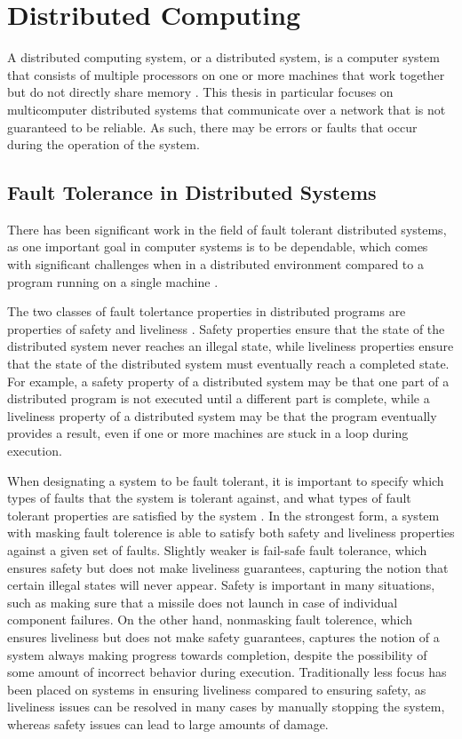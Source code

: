 \documentclass[twoside]{report}
\begin{document}
\section{Distributed Computing}

A distributed computing system, or a distributed system, is a computer system that consists of multiple processors on one or more machines that work together but do not directly share memory \cite{10.1145/72551.72552}.
This thesis in particular focuses on multicomputer distributed systems that communicate over a network that is not guaranteed to be reliable.
As such, there may be errors or faults that occur during the operation of the system.

\subsection{Fault Tolerance in Distributed Systems}
There has been significant work in the field of fault tolerant distributed systems, as one important goal in computer systems is to be dependable, which comes with significant challenges when in a distributed environment compared to a program running on a single machine \cite{10.1145/311531.311532}.

The two classes of fault tolertance properties in distributed programs are properties of safety and liveliness \cite{1702415}.
Safety properties ensure that the state of the distributed system never reaches an illegal state, while liveliness properties ensure that the state of the distributed system must eventually reach a completed state.
For example, a safety property of a distributed system may be that one part of a distributed program is not executed until a different part is complete, while a liveliness property of a distributed system may be that the program eventually provides a result, even if one or more machines are stuck in a loop during execution.

When designating a system to be fault tolerant, it is important to specify which types of faults that the system is tolerant against, and what types of fault tolerant properties are satisfied by the system \cite{10.1145/311531.311532}.
In the strongest form, a system with masking fault tolerence is able to satisfy both safety and liveliness properties against a given set of faults.
Slightly weaker is fail-safe fault tolerance, which ensures safety but does not make liveliness guarantees, capturing the notion that certain illegal states will never appear.
Safety is important in many situations, such as making sure that a missile does not launch in case of individual component failures.
On the other hand, nonmasking fault tolerence, which ensures liveliness but does not make safety guarantees, captures the notion of a system always making progress towards completion, despite the possibility of some amount of incorrect behavior during execution.
Traditionally less focus has been placed on systems in ensuring liveliness compared to ensuring safety, as liveliness issues can be resolved in many cases by manually stopping the system, whereas safety issues can lead to large amounts of damage.
\end{document}
